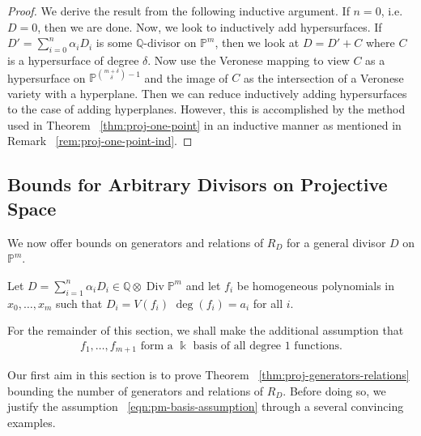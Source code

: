 \documentclass{amsart}
\theoremstyle{plain}
\theoremstyle{definition}
\theoremstyle{remark}
\numberwithin{equation}{section}
\newcommand\ssec{\subsection}
\newcommand\bq{{\mathbb Q}}
\newcommand\bp{{\mathbb P}}
\newcommand\bk{{\Bbbk}}
\DeclareMathOperator\di{Div}
\newcommand\pdeg{\delta}
\begin{document}
\begin{proof}
We derive the result from the following inductive argument.
If $n = 0$, i.e.~ $D = 0$, then we are done.
Now, we look to inductively add hypersurfaces.
If $D' = \sum_{i = 0}^{n} \alpha_i D_i$ is some $\bq$-divisor
on $\bp^m$, then we look at $D = D' + C$ where $C$ is a
hypersurface of degree $\pdeg$.  Now use the Veronese mapping
to view $C$ as a hypersurface on $\bp^{\binom{{m + \pdeg}}{ \pdeg} -1 }$
and the image of $C$ as the intersection of a Veronese variety
with a hyperplane. Then we can reduce inductively adding hypersurfaces
to the case of adding hyperplanes. However, this is accomplished
by the method used in Theorem ~\ref{thm:proj-one-point} in an
inductive manner as mentioned in Remark ~\ref{rem:proj-one-point-ind}.
\end{proof}


\ssec{Bounds for Arbitrary Divisors on Projective Space}


We now offer bounds on generators and relations of $R_D$ for a general divisor $D$ on $\bp^m$.

Let $D = \sum_{i=1}^n \alpha_i D_i \in \bq \otimes \di \bp^m$ and let $f_i$ be
homogeneous polynomials in $x_0, \ldots, x_m$ such that $D_i = V(f_i)$
$\deg(f_i) = a_i$ for all $i$. 

For the remainder of this section, we shall make the additional assumption that 
\begin{align}
\label{eqn:pm-basis-assumption}
	f_1, \ldots, f_{m+1} \text{ form a } \bk \text{ basis of all degree 1 functions.}
\end{align}

Our first aim in this section is to prove Theorem
~\ref{thm:proj-generators-relations} bounding the number of generators and
relations of $R_D$. Before doing so, we justify the assumption
~\eqref{eqn:pm-basis-assumption} through a several convincing examples.
\end{document}
